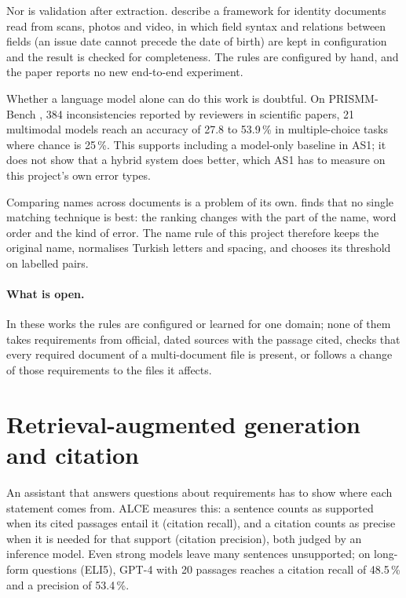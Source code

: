 Nor is validation after extraction. \textcite{bulatov2022identity} describe a framework for
identity documents read from scans, photos and video, in which field syntax and relations between
fields (an issue date cannot precede the date of birth) are kept in configuration and the result
is checked for completeness. The rules are configured by hand, and the paper reports no new
end-to-end experiment.

Whether a language model alone can do this work is doubtful. On PRISMM-Bench
\autocite{selch2025prismm}, 384 inconsistencies reported by reviewers in scientific papers, 21
multimodal models reach an accuracy of 27.8 to 53.9\,\% in multiple-choice tasks where chance is
25\,\%. This supports including a model-only baseline in AS1; it does not show that a hybrid
system does better, which AS1 has to measure on this project's own error types.

Comparing names across documents is a problem of its own. \textcite{christen2006names} finds
that no single matching technique is best: the ranking changes with the part of the name, word
order and the kind of error. The name rule of this project therefore keeps the original name,
normalises Turkish letters and spacing, and chooses its threshold on labelled pairs.

\paragraph{What is open.} In these works the rules are configured or learned for one domain; none
of them takes requirements from official, dated sources with the passage cited, checks that every
required document of a multi-document file is present, or follows a change of those requirements
to the files it affects.

\section{Retrieval-augmented generation and citation}
An assistant that answers questions about requirements has to show where each statement comes
from. ALCE \autocite{gao2023alce} measures this: a sentence counts as supported when its cited
passages entail it (citation recall), and a citation counts as precise when it is needed for that
support (citation precision), both judged by an inference model. Even strong models leave many
sentences unsupported; on long-form questions (ELI5), GPT-4 with 20 passages reaches a citation
recall of 48.5\,\% and a precision of 53.4\,\%.

